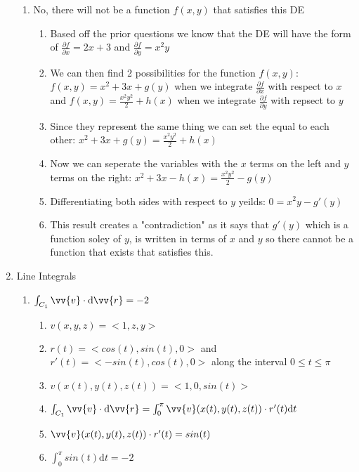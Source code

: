 \documentclass{article}
\begin{document}
\begin{enumerate}
\begin{enumerate}
        \item No, there will not be a function $f(x,y)$ that satisfies this DE
        \begin{enumerate}
            \item Based off the prior questions we know that the DE will have the form of $\frac{\partial f}{\partial x} = 2x + 3$ and $\frac{\partial f}{\partial y} = x^2 y$
            \item We can then find 2 possibilities for the function $f(x,y)$: $f(x,y) = x^2 + 3x + g(y) $ when we integrate $\frac{\partial f}{\partial x} $ with respect to $x$ and $f(x,y) = \frac{x^2 y^2}{2} + h(x) $ when we integrate $\frac{\partial f}{\partial y} $ with repsect to $y$
            \item Since they represent the same thing we can set the equal to each other: $x^2 + 3x + g(y) = \frac{x^2 y^2}{2} + h(x) $
            \item Now we can seperate the variables with the $x$ terms on the left and $y$ terms on the right: $x^2 + 3x - h(x) = \frac{x^2 y^2}{2} - g(y)$ 
            \item Differentiating both sides with respect to $y$ yeilds: $ 0 = x^2y - g'(y) $ 
            \item This result creates a "contradiction" as it says that $g'(y)$ which is a function soley of $y$, is written in terms of $x$ and $y$ so there cannot be a function that exists that satisfies this.
        \end{enumerate}
    \end{enumerate}
    \item Line Integrals
    \begin{enumerate}
        \item $\int_{C_1}^{} \vv{v} \cdot \mathrm{d} \vv{r}  = -2$
        \begin{enumerate}
            \item $v(x,y,z) = <1,z,y>$
            \item $r(t) = <cos(t),sin(t),0>$ and $r'(t) = <-sin(t),cos(t),0> $ along the interval $0 \leq t \leq \pi$
            \item $v(x(t),y(t),z(t)) = <1,0,sin(t)> $
            \item $\int_{C_1}^{} \vv{v} \cdot \mathrm{d} \vv{r} = \int_{0}^{\pi} \vv{v}(x(t),y(t),z(t)) \cdot r'(t) \mathrm{d} t$
            \item $\vv{v}(x(t),y(t),z(t)) \cdot r'(t) = sin(t)$
            \item $ \int_{0}^{\pi} sin(t) \mathrm{d}t  = -2$

\end{enumerate}
\end{enumerate}
\end{enumerate}
\end{document}
